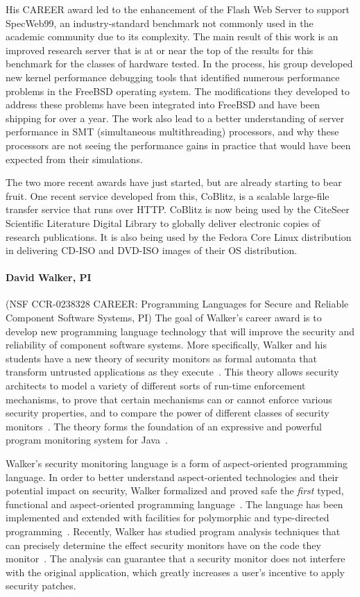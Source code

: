 \documentclass[11pt]{article}
\begin{document}
His CAREER award led to the enhancement of the Flash Web Server to
support SpecWeb99, an industry-standard benchmark not commonly used in
the academic community due to its complexity. The main result of this
work is an improved research server that is at or near the top of the
results for this benchmark for the classes of hardware tested. In the
process, his group developed new kernel performance debugging tools
that identified numerous performance problems in the FreeBSD operating
system. The modifications they developed to address these problems
have been integrated into FreeBSD and have been shipping for over a
year.  The work also lead to a better understanding of server
performance in SMT (simultaneous multithreading) processors, and why
these processors are not seeing the performance gains in practice that
would have been expected from their simulations.

The two more recent awards have just started, but are already starting
to bear fruit. One recent service developed from this, CoBlitz, is a
scalable large-file transfer service that runs over HTTP. CoBlitz is
now being used by the CiteSeer Scientific Literature Digital Library
to globally deliver electronic copies of research publications. It is
also being used by the Fedora Core Linux distribution in delivering
CD-ISO and DVD-ISO images of their OS distribution.

\paragraph*{David Walker, PI} (NSF CCR-0238328 CAREER: Programming Languages for Secure and Reliable Component Software
Systems, PI)
The goal of Walker's career award is to develop new programming language
technology that will improve the security and reliability of 
component software systems.  More specifically, Walker and his students have 
a new theory of security monitors as formal
automata that transform untrusted applications as they 
execute~\cite{ligatti+:edit-automata}.
This theory allows security
architects to model a variety of different sorts of run-time
enforcement mechanisms, to prove that certain mechanisms can or cannot
enforce various security properties, and to compare the power of
different classes of security monitors~\cite{ligatti+:renewal}.
The theory forms the foundation of an expressive and powerful
program monitoring system for Java~\cite{bauer+:polymer}.

Walker's security monitoring language is a form of 
aspect-oriented programming language.
In order to better understand aspect-oriented technologies and their
potential impact on security, Walker formalized and proved
safe the {\em first} typed, functional and 
aspect-oriented programming language~\cite{walker+:aspects}.
The language has been implemented and
extended with facilities for polymorphic
and type-directed programming~\cite{dantas+:polyaml}.  
Recently, Walker has studied program analysis techniques
that can precisely determine the effect security monitors have on
the code they monitor~\cite{dantas+:harmless-advice,dantas+:harmless-popl}.   
The analysis
can guarantee that a security monitor does not interfere with the 
original application, which greatly increases a user's incentive
to apply security patches.
\end{document}
